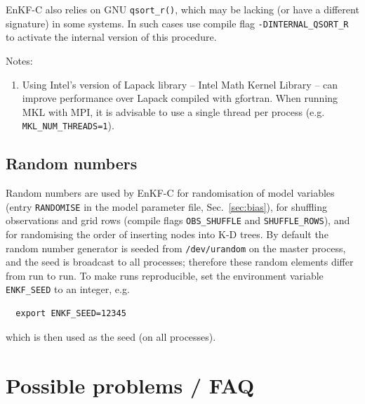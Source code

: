 \documentclass[11pt]{report}
\begin{document}
EnKF-C also relies on GNU \verb|qsort_r()|, which may be lacking (or have a different signature) in some systems.
In such cases use compile flag \verb|-DINTERNAL_QSORT_R| to activate the internal version of this procedure.

Notes:
\vspace{-3mm}
\begin{enumerate}
\item Using Intel's version of Lapack library -- Intel Math Kernel Library -- can improve performance over Lapack compiled with gfortran.
When running MKL with MPI, it is advisable to use a single thread per process (e.g. \verb|MKL_NUM_THREADS=1|).
\end{enumerate}

\subsection{Random numbers}
\label{sec:seed}

Random numbers are used by EnKF-C for randomisation of model variables (entry \verb|RANDOMISE| in the model parameter file, Sec.~\ref{sec:bias}), for shuffling observations and grid rows (compile flags \verb|OBS_SHUFFLE| and \verb|SHUFFLE_ROWS|), and for randomising the order of inserting nodes into K-D trees.
By default the random number generator is seeded from \verb|/dev/urandom| on the master process, and the seed is broadcast to all processes; therefore these random elements differ from run to run.
To make runs reproducible, set the environment variable \verb|ENKF_SEED| to an integer, e.g.
\begin{Verbatim}
  export ENKF_SEED=12345
\end{Verbatim}
which is then used as the seed (on all processes).

\section{Possible problems / FAQ}
\end{document}
